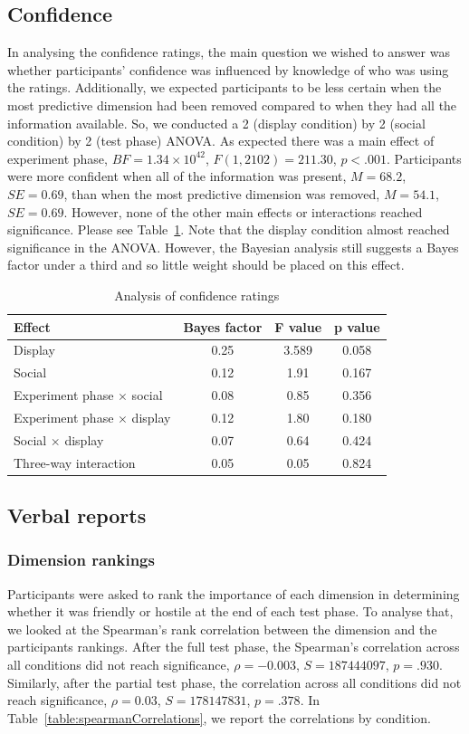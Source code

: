 \documentclass[doc, a4paper, apacite]{apa6}
\begin{document}
\subsection{Confidence}
In analysing the confidence ratings, the main question we wished to answer was whether participants' confidence was influenced by knowledge of who was using the ratings. 
Additionally, we expected participants to be less certain when the most predictive dimension had been removed compared to when they had all the information available. 
So, we conducted a 2 (display condition) by 2 (social condition) by 2 (test phase) ANOVA. 
As expected there was a main effect of experiment phase, $BF=1.34 \times 10^{42}$, $F(1, 2102)=211.30$, $p<.001$. 
Participants were more confident when all of the information was present, $M=68.2$, $SE=0.69$, than when the most predictive dimension was removed, $M=54.1$, $SE=0.69$. 
However, none of the other main effects or interactions reached significance. 
Please see Table~\ref{table:confidenceAnalysis}. 
Note that the display condition almost reached significance in the ANOVA. 
However, the Bayesian analysis still suggests a Bayes factor under a third and so little weight should be placed on this effect. 

\begin{table}[b]
	\centering
	\caption{Analysis of confidence ratings}
	\label{table:confidenceAnalysis}
	\begin{tabular}{l c c c}
		\toprule
		Effect & Bayes factor & F value & p value \\
		\midrule
		Display & 0.25 & 3.589 & 0.058 \\
		Social & 0.12 & 1.91 & 0.167 \\
		Experiment phase $\times$ social & 0.08 & 0.85 & 0.356 \\
		Experiment phase $\times$ display & 0.12 & 1.80 & 0.180 \\
		Social $\times$ display & 0.07 & 0.64 & 0.424 \\
		Three-way interaction & 0.05 & 0.05 & 0.824 \\
		\bottomrule
	\end{tabular}
\end{table}

\subsection{Verbal reports}
\subsubsection{Dimension rankings}
Participants were asked to rank the importance of each dimension in determining whether it was friendly or hostile at the end of each test phase. 
To analyse that, we looked at the Spearman's rank correlation between the dimension and the participants rankings. 
After the full test phase, the Spearman's correlation across all conditions did not reach significance, $\rho=-0.003$, $S=187444097$, $p=.930$.
Similarly, after the partial test phase, the correlation across all conditions did not reach significance, $\rho=0.03$, $S=178147831$, $p=.378$. 
In Table~\ref{table:spearmanCorrelations}, we report the correlations by condition. 
\end{document}
